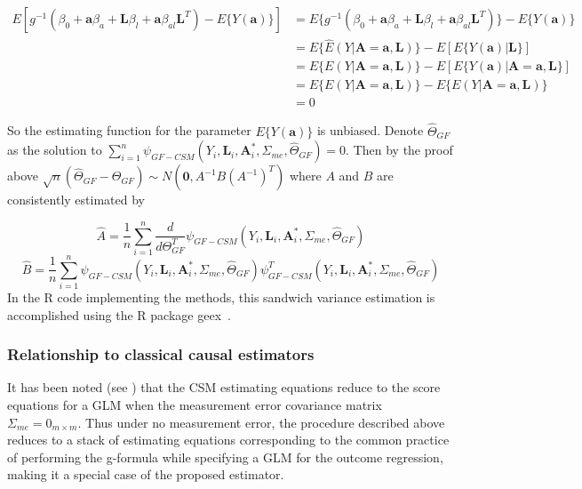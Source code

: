 \documentclass[12pt]{article}
\begin{document}
\begin{align*}
E[g^{-1}(\beta_{0} + \bm{a}\beta_{a} + \bm{L}\beta_{l} +
        \bm{a}\beta_{al}\bm{L}^{T}) - E \{ Y(\bm{a}) \}] &= E \{ g^{-1}(\beta_{0} + \bm{a}\beta_{a} + \bm{L}\beta_{l} +
        \bm{a}\beta_{al}\bm{L}^{T}) \} - E \{ Y(\bm{a}) \} \\
&= E \{ \hat{E}(Y | \bm{A} = \bm{a}, \bm{L}) \} - E[E \{ Y(\bm{a}) | \bm{L} \}] \\
&= E \{ E(Y | \bm{A} = \bm{a}, \bm{L}) \} - E[E \{ Y(\bm{a}) | \bm{A} = \bm{a}, \bm{L} \}] \\
&= E \{ E(Y | \bm{A} = \bm{a}, \bm{L}) \} - E\{ E(Y | \bm{A} = \bm{a}, \bm{L})\} \\
&=0
\end{align*}

So the estimating function for the parameter $E \{ Y(\bm{a}) \}$ is unbiased. Denote $\hat{\Theta}_{GF}$ as the solution to $\sum_{i=1}^{n} \psi_{GF-CSM}(Y_{i}, \bm{L}_{i}, \bm{A}^{*}_{i}, \Sigma_{me}, \hat{\Theta}_{GF}) = 0$. Then by the proof above $\sqrt{n}(\hat{\Theta}_{GF} - \Theta_{GF}) \sim N(\textbf{0}, A^{-1}B(A^{-1})^{T})$ where $A$ and $B$ are consistently estimated by

\begin{equation*}
\hat{A} = \frac{1}{n} \sum_{i=1}^{n} \frac{d}{d\Theta_{GF}^{T}} \psi_{GF-CSM}(Y_{i}, \bm{L}_{i}, \bm{A}^{*}_{i}, \Sigma_{me}, \hat{\Theta}_{GF})
\end{equation*}
\begin{equation*}
\hat{B} = \frac{1}{n} \sum_{i=1}^{n} \psi_{GF-CSM}(Y_{i}, \bm{L}_{i}, \bm{A}^{*}_{i}, \Sigma_{me}, \hat{\Theta}_{GF}) \psi^{T}_{GF-CSM}(Y_{i}, \bm{L}_{i}, \bm{A}^{*}_{i}, \Sigma_{me}, \hat{\Theta}_{GF})
\end{equation*}
In the R code implementing the methods, this sandwich variance estimation is accomplished using the R package geex~\citep{saul2017}.

\subsubsection{Relationship to classical causal estimators}

It has been noted (see \citet{carroll2006}) that the CSM estimating equations reduce to the score equations for a GLM when the measurement error covariance matrix $\Sigma_{me} = 0_{m \times m}$. Thus under no measurement error, the procedure described above reduces to a stack of estimating equations corresponding to the common practice of performing the g-formula while specifying a GLM for the outcome regression, making it a special case of the proposed estimator.
\end{document}
